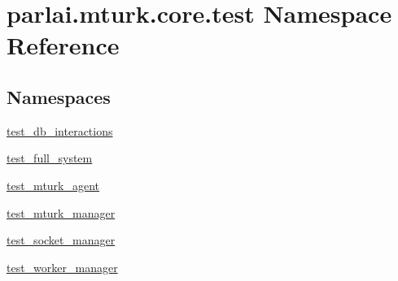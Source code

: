 \hypertarget{namespaceparlai_1_1mturk_1_1core_1_1test}{}\section{parlai.\+mturk.\+core.\+test Namespace Reference}
\label{namespaceparlai_1_1mturk_1_1core_1_1test}
\subsection*{Namespaces}
\begin{DoxyCompactItemize}
\item 
 \hyperlink{namespaceparlai_1_1mturk_1_1core_1_1test_1_1test__db__interactions}{test\+\_\+db\+\_\+interactions}
\item 
 \hyperlink{namespaceparlai_1_1mturk_1_1core_1_1test_1_1test__full__system}{test\+\_\+full\+\_\+system}
\item 
 \hyperlink{namespaceparlai_1_1mturk_1_1core_1_1test_1_1test__mturk__agent}{test\+\_\+mturk\+\_\+agent}
\item 
 \hyperlink{namespaceparlai_1_1mturk_1_1core_1_1test_1_1test__mturk__manager}{test\+\_\+mturk\+\_\+manager}
\item 
 \hyperlink{namespaceparlai_1_1mturk_1_1core_1_1test_1_1test__socket__manager}{test\+\_\+socket\+\_\+manager}
\item 
 \hyperlink{namespaceparlai_1_1mturk_1_1core_1_1test_1_1test__worker__manager}{test\+\_\+worker\+\_\+manager}
\end{DoxyCompactItemize}
